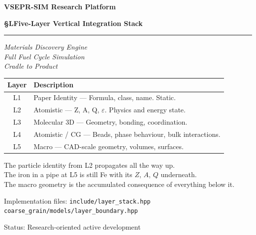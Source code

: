 \documentclass[11pt, a4paper, oneside]{article}
\theoremstyle{definition}
\newcommand{\file}[1]{\texttt{#1}}
\begin{document}

\begin{titlepage}
  \centering
  \vspace*{1.8cm}
  {\Huge\bfseries VSEPR-SIM Research Platform\par}
  \vspace{0.8cm}
  {\Large\bfseries §L\quad Five-Layer Vertical Integration Stack\par}
  \vspace{0.5cm}
  \rule{0.7\textwidth}{0.6pt}\par
  \vspace{0.8cm}
  {\large\itshape
    Materials Discovery Engine\\[0.3em]
    Full Fuel Cycle Simulation\\[0.3em]
    Cradle to Product\par}
  \vspace{1.2cm}
  \begin{tabular}{cl}
    \toprule
    Layer & Description \\
    \midrule
    L1 & Paper Identity — Formula, class, name.  Static. \\
    L2 & Atomistic — Z, A, Q, $\varepsilon$.  Physics and energy state. \\
    L3 & Molecular 3D — Geometry, bonding, coordination. \\
    L4 & Atomistic / CG — Beads, phase behaviour, bulk interactions. \\
    L5 & Macro — CAD-scale geometry, volumes, surfaces. \\
    \bottomrule
  \end{tabular}
  \vspace{1.2cm}

  {\normalsize
    The particle identity from L2 propagates all the way up.\\
    The iron in a pipe at L5 is still Fe with its $Z$, $A$, $Q$ underneath.\\
    The macro geometry is the accumulated consequence of everything below it.\par
  }
  \vfill
  {\small
    Implementation files:\quad
    \file{include/layer\_stack.hpp} \quad
    \file{coarse\_grain/models/layer\_boundary.hpp}\par
    \vspace{0.3em}
    Status: Research-oriented active development
  }
\end{titlepage}
\end{document}
